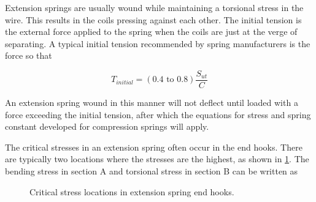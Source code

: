 \documentclass[
10pt,
a4paper,
openany,
svgnames,
]{book}
\begin{document}
Extension springs are usually wound while maintaining a torsional stress in the wire. This results in the coils pressing against each other. The initial tension is the external force applied to the spring when the coils are just at the verge of separating. A typical initial tension recommended by spring manufacturers is the force so that

\begin{equation}
  T_{initial} = (0.4 \text{ to } 0.8)\frac{S_{ut}}{C}
\end{equation}

An extension spring wound in this manner will not deflect until loaded with a force exceeding the initial tension, after which the equations for stress and spring constant developed for compression springs will apply.

The critical stresses in an extension spring often occur in the end hooks. There are typically two locations where the stresses are the highest, as shown in \cref{fig: stress in extension spring hooks}. The bending stress in section A and torsional stress in section B can be written as

\begin{figure}[h]
  \centering
  \caption{Critical stress locations in extension spring end hooks.}
  \label{fig: stress in extension spring hooks}
\end{figure}
\end{document}
